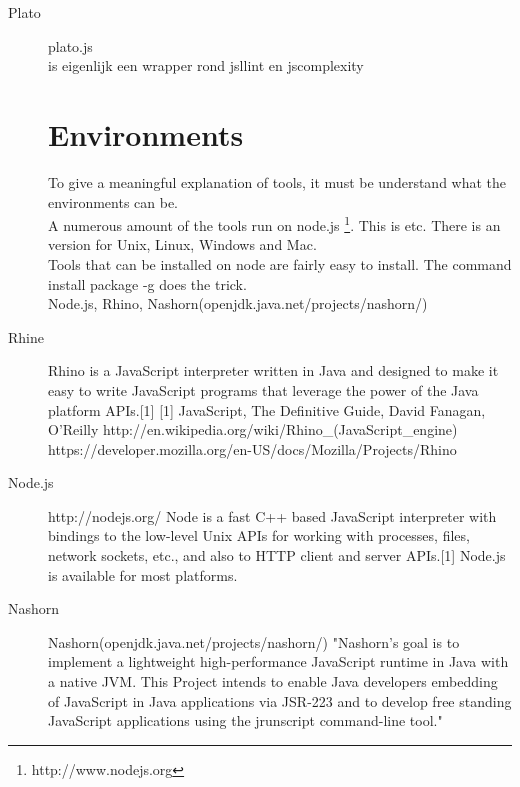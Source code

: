 \documentclass{article}
\begin{document}
\begin{description}
\item[Plato]plato.js\\
is eigenlijk een wrapper rond jsllint en jscomplexity


\section{Environments}
To give a meaningful explanation of tools, it must be understand what the environments can be.\\
A numerous amount of the tools run on node.js \footnote{http://www.nodejs.org}. This is etc.
There is an version for Unix, Linux, Windows and Mac.\\
Tools that can be installed on node are fairly easy to install. The command install package -g does the trick.\\
Node.js, Rhino, Nashorn(openjdk.java.net/projects/nashorn/)

\item[Rhine]Rhino is a JavaScript interpreter written in Java and designed to make it easy to write JavaScript programs that leverage the power of the Java platform APIs.[1]
[1] JavaScript, The Definitive Guide, David Fanagan, O'Reilly\newline
http://en.wikipedia.org/wiki/Rhino\_(JavaScript\_engine)
https://developer.mozilla.org/en-US/docs/Mozilla/Projects/Rhino

\item[Node.js]
http://nodejs.org/
Node is a fast C++ based JavaScript interpreter with bindings to the low-level Unix APIs for working with processes, files, network sockets, etc., and also to HTTP client and server APIs.[1]
Node.js is available for most platforms.

\item[Nashorn]Nashorn(openjdk.java.net/projects/nashorn/)
"Nashorn's goal is to implement a lightweight high-performance JavaScript runtime in Java with a native JVM. This Project intends to enable Java developers embedding of JavaScript in Java applications via JSR-223 and to develop free standing JavaScript applications using the jrunscript command-line tool."


\end{description}
\end{document}
